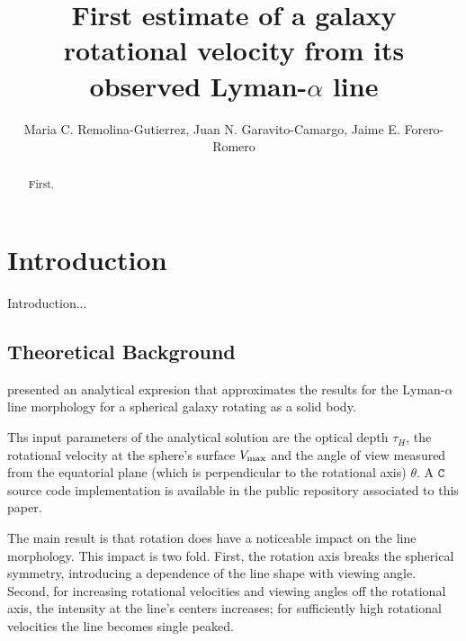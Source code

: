 \documentclass{emulateapj}
\newcommand{\ly}{{\ifmmode{{\rm Ly}\alpha~}\else{Ly$\alpha$~}\fi}}
\begin{document}
\title{First estimate of a galaxy rotational velocity from
  its observed Lyman-$\alpha$ line} 


\author{ Maria C. Remolina-Gutierrez, Juan N. Garavito-Camargo, Jaime
  E. Forero-Romero}  

\begin{abstract}
First.
\end{abstract}


\section{Introduction}
\label{sec:intro}

Introduction... \\ 
\cite{Garavito14}


\subsection{Theoretical Background}
\label{sec:theo}


\cite{Garavito14} presented an analytical expresion that approximates
the results for the Lyman-$\alpha$ line morphology for a spherical galaxy
rotating as a solid body.

Ths input parameters of the analytical solution are the optical depth
$\tau_{H}$, the rotational velocity at the sphere's surface $V_{\rm
  max}$ and the angle of view measured from the equatorial plane
(which is perpendicular to the rotational axis) $\theta$. 
A $\texttt{C}$ source code implementation is available in the public
repository associated to this paper.

The main result \cite{Garavito14} is that rotation does have a
noticeable impact on the \ly line morphology.
This impact is two fold. 
First, the rotation axis breaks the spherical symmetry, introducing a
dependence of the line shape with viewing angle.
Second, for increasing rotational velocities and viewing angles off
the rotational axis, the intensity at the line's centers increases;
for sufficiently high rotational velocities the line becomes single peaked. 
\end{document}
